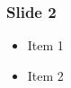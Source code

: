 \begin{frame}
	\frametitle{Slide 2}

	\begin{itemize}
		\item Item 1
		\item Item 2
	\end{itemize}
\end{frame}